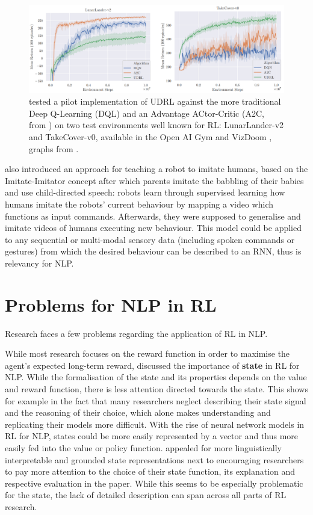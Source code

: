 \documentclass[11pt,a4paper]{article}
\begin{document}
\begin{figure}[h!]
\centering
\includegraphics[scale=.39]{img/udrl_test_image.PNG}
\caption{\citet{srivastava2019training} tested a pilot implementation of UDRL against the more traditional Deep Q-Learning (DQL) and an Advantage ACtor-Critic (A2C, from \citep{mnih-2015}) on two test environments well known for RL: LunarLander-v2 and TakeCover-v0, available in the Open AI Gym and VizDoom \citep{openaigym, vizdoom}, graphs from \citep{srivastava2019training}.}
\end{figure}
\newpage

\cite{schmidhuber2019reinforcement} also introduced an approach for teaching a robot to imitate humans, based on the Imitate-Imitator concept after which parents imitate the babbling of their babies and use child-directed speech: robots learn through supervised learning how humans imitate the robots' current behaviour by mapping a video which functions as input commands. Afterwards, they were supposed to generalise and imitate videos of humans executing new behaviour. This model could be applied to any sequential or multi-modal sensory data (including spoken commands or gestures) from which the desired behaviour can be described to an RNN, thus is relevancy for NLP. 

\section{Problems for NLP in RL}
Research faces a few problems regarding the application of RL in NLP. 

While most research focuses on the reward function in order to maximise the agent's expected long-term reward, \citet{madureira2020} discussed the importance of \textbf{state} in RL for NLP. While the formalisation of the state and its properties depends on the value and reward function, there is less attention directed towards the state. This shows for example in the fact that many researchers neglect describing their state signal and the reasoning of their choice, which alone makes understanding and replicating their models more difficult. With the rise of neural network models in RL for NLP, states could be more easily represented by a vector and thus more easily fed into the value or policy function. \citet{madureira2020} appealed for more linguistically interpretable and grounded state representations next to encouraging researchers to pay more attention to the choice of their state function, its explanation and respective evaluation in the paper. While this seems to be especially problematic for the state, the lack of detailed description can span across all parts of RL research.
\end{document}
